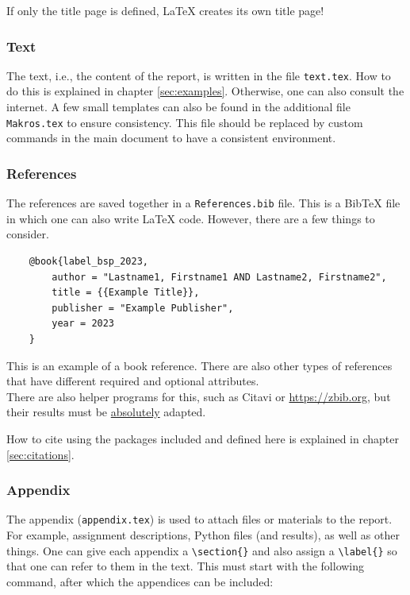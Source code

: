\textcolor{red1}{If only the title page is defined, \LaTeX{} creates its own title page!}

\subsubsection{Text}

The text, i.e., the content of the report, is written in the file \verb|text.tex|. How to do this is explained in chapter \ref{sec:examples}. Otherwise, one can also consult the internet. A few small templates can also be found in the additional file \verb|Makros.tex| to ensure consistency. \textcolor{red1}{This file should be replaced by custom commands in the main document to have a consistent environment.}


\subsubsection{References}

The references are saved together in a \verb|References.bib| file. This is a BibTeX file in which one can also write \LaTeX{} code. However, there are a few things to consider.

\begin{verbatim}
    @book{label_bsp_2023,
        author = "Lastname1, Firstname1 AND Lastname2, Firstname2",
        title = {{Example Title}},
        publisher = "Example Publisher",
        year = 2023
    }
\end{verbatim}

This is an example of a book reference. There are also other types of references that have different required and optional attributes.\\

There are also helper programs for this, such as Citavi or \url{https://zbib.org}, but their results must be \textcolor{red1}{\underline{absolutely}} adapted.

How to cite using the packages included and defined here is explained in chapter \ref{sec:citations}.


\subsubsection{Appendix}

The appendix (\verb|appendix.tex|) is used to attach files or materials to the report. For example, assignment descriptions, Python files (and results), as well as other things. One can give each appendix a \verb|\section{}| and also assign a \verb|\label{}| so that one can refer to them in the text. This must start with the following command, after which the appendices can be included:

